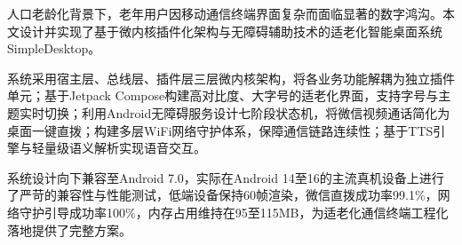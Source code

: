 人口老龄化背景下，老年用户因移动通信终端界面复杂而面临显著的数字鸿沟。本文设计并实现了基于微内核插件化架构与无障碍辅助技术的适老化智能桌面系统SimpleDesktop。

系统采用宿主层、总线层、插件层三层微内核架构，将各业务功能解耦为独立插件单元；基于Jetpack Compose构建高对比度、大字号的适老化界面，支持字号与主题实时切换；利用Android无障碍服务设计七阶段状态机，将微信视频通话简化为桌面一键直拨；构建多层WiFi网络守护体系，保障通信链路连续性；基于TTS引擎与轻量级语义解析实现语音交互。

系统设计向下兼容至Android 7.0，实际在Android 14至16的主流真机设备上进行了严苛的兼容性与性能测试，低端设备保持60帧渲染，微信直拨成功率99.1\%，网络守护引导成功率100\%，内存占用维持在95至115MB，为适老化通信终端工程化落地提供了完整方案。

